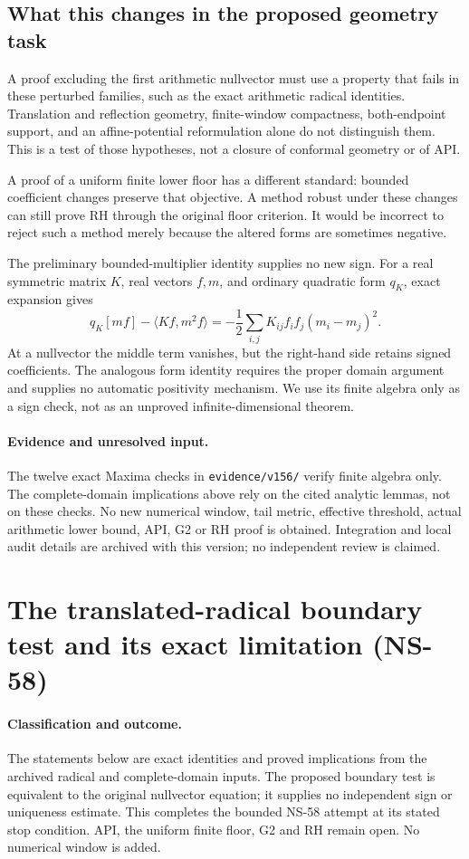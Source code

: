 \documentclass[11pt]{article}
\theoremstyle{remark}
\begin{document}
\subsection*{What this changes in the proposed geometry task}
A proof excluding the first arithmetic nullvector must use a property
that fails in these perturbed families, such as the exact arithmetic
radical identities. Translation and reflection geometry, finite-window
compactness, both-endpoint support, and an affine-potential reformulation
alone do not distinguish them. This is a test of those hypotheses,
not a closure of conformal geometry or of API.

A proof of a uniform finite lower floor has a different standard:
bounded coefficient changes preserve that objective. A method robust
under these changes can still prove RH through the original floor
criterion. It would be incorrect to reject such a method merely
because the altered forms are sometimes negative.

The preliminary bounded-multiplier identity supplies no new sign.
For a real symmetric matrix $K$, real vectors $f,m$, and ordinary
quadratic form $q_K$, exact expansion gives
\[
 q_K[mf]-\langle Kf,m^2f\rangle
 =-\frac12\sum_{i,j}K_{ij}f_if_j(m_i-m_j)^2.
\]
At a nullvector the middle term vanishes, but the right-hand side
retains signed coefficients. The analogous form identity requires
the proper domain argument and supplies no automatic positivity
mechanism. We use its finite algebra only as a sign check, not as
an unproved infinite-dimensional theorem.


\paragraph{Evidence and unresolved input.}
The twelve exact Maxima checks in \texttt{evidence/v156/} verify finite
algebra only. The complete-domain implications above rely on the cited
analytic lemmas, not on these checks. No new numerical window, tail metric,
effective threshold, actual arithmetic lower bound, API, G2 or RH proof is
obtained. Integration and local audit details are archived with this version;
no independent review is claimed.

\section{The translated-radical boundary test and its exact limitation (NS-58)}
\label{sec:ns58-boundary}

\paragraph{Classification and outcome.}
The statements below are exact identities and proved implications from
the archived radical and complete-domain inputs. The proposed boundary
test is equivalent to the original nullvector equation; it supplies no
independent sign or uniqueness estimate. This completes the bounded
NS-58 attempt at its stated stop condition. API, the uniform finite
floor, G2 and RH remain open. No numerical window is added.
\end{document}
